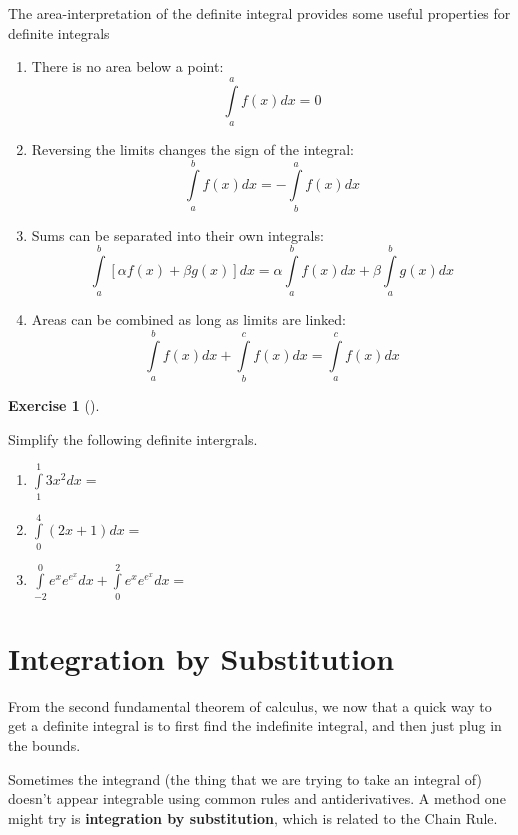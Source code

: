 \documentclass[
  letterpaper,
]{book}
\providecommand{\tightlist}{%
  \setlength{\itemsep}{0pt}\setlength{\parskip}{0pt}}\usepackage{longtable,booktabs,array}
\theoremstyle{definition}
\theoremstyle{definition}
\theoremstyle{plain}
\theoremstyle{definition}
\newtheorem{exercise}{Exercise}[chapter]
\theoremstyle{plain}
\theoremstyle{plain}
\theoremstyle{remark}
\begin{document}
The area-interpretation of the definite integral provides some useful
properties for definite integrals

\hypertarget{prop-}{}
\begin{enumerate}
\def\labelenumi{\arabic{enumi}.}
\tightlist
\item
  There is no area below a point: \[\int\limits_a^a f(x)dx=0\]
\item
  Reversing the limits changes the sign of the integral:
  \[\int\limits_a^b f(x)dx=-\int\limits_b^a f(x)dx\]
\item
  Sums can be separated into their own integrals:
  \[\int\limits_a^b [\alpha f(x)+\beta g(x)]dx = \alpha \int\limits_a^b f(x)dx + \beta \int\limits_a^b g(x)dx\]
\item
  Areas can be combined as long as limits are linked:
  \[\int\limits_a^b f(x) dx +\int\limits_b^c f(x)dx = \int\limits_a^c f(x)dx\]
\end{enumerate}

\leavevmode{}%
\begin{exercise}[]\label{exr-}

Simplify the following definite intergrals.

\begin{enumerate}
\def\labelenumi{\arabic{enumi}.}
\tightlist
\item
  \(\int\limits_1^1 3x^2 dx =\)
\item
  \(\int\limits_0^4 (2x+1)dx=\)
\item
  \(\int\limits_{-2}^0 e^x e^{e^x} dx + \int\limits_0^2 e^x e^{e^x} dx =\)
\end{enumerate}

\end{exercise}

\hypertarget{integration-by-substitution}{%
\section{Integration by
Substitution}\label{integration-by-substitution}}

From the second fundamental theorem of calculus, we now that a quick way
to get a definite integral is to first find the indefinite integral, and
then just plug in the bounds.

Sometimes the integrand (the thing that we are trying to take an
integral of) doesn't appear integrable using common rules and
antiderivatives. A method one might try is \textbf{integration by
substitution}, which is related to the Chain Rule.
\end{document}
